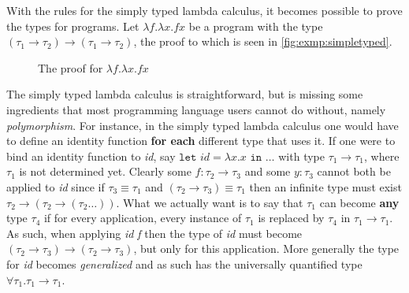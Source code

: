 \begin{exmp}
  With the rules for the simply typed lambda calculus, it becomes possible to prove the types for programs.
  Let $\lambda f.\lambda x.f x$ be a program with the type $(\tau_1 \rightarrow \tau_2) \rightarrow (\tau_1 \rightarrow \tau_2)$, the proof to which is seen in \autoref{fig:exmp:simpletyped}.
  \begin{figure}[ht]
    \begin{mdframed}[style=bigbox]
      \begin{prooftree}
      \end{prooftree}
    \end{mdframed}
    \caption{The proof for $\lambda f. \lambda x . fx$}
    \label{fig:exmp:simpletyped}
  \end{figure}
\end{exmp}

The simply typed lambda calculus is straightforward, but is missing some ingredients that most programming language users cannot do without, namely \textit{polymorphism}.
For instance, in the simply typed lambda calculus one would have to define an identity function \textbf{for each} different type that uses it.
If one were to bind an identity function to \textit{id}, say $\texttt{let } \textit{id} = \lambda x. x \texttt{ in } \dots$ with type $\tau_1 \rightarrow \tau_1$, where $\tau_1$ is not determined yet.
Clearly some $f: \tau_2 \rightarrow \tau_3$ and some $y: \tau_3$ cannot both be applied to \textit{id} since if $\tau_3 \equiv \tau_1$ and $(\tau_2 \rightarrow \tau_3) \equiv \tau_1$ then an infinite type must exist $\tau_2 \rightarrow (\tau_2 \rightarrow (\tau_2 \dots))$.
What we actually want is to say that $\tau_1$ can become \textbf{any} type $\tau_4$ if for every application, every instance of $\tau_1$ is replaced by $\tau_4$ in $\tau_1 \rightarrow \tau_1$.
As such, when applying \textit{id f} then the type of \textit{id} must become $(\tau_2 \rightarrow \tau_3) \rightarrow (\tau_2 \rightarrow \tau_3)$, but only for this application.
More generally the type for \textit{id} becomes \textit{generalized} and as such has the universally quantified type $\forall \tau_1. \tau_1 \rightarrow \tau_1$.

